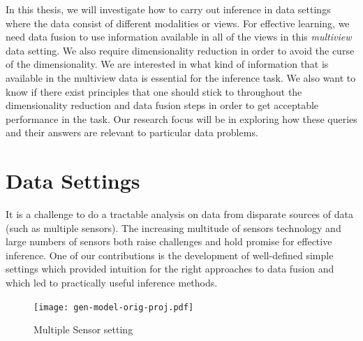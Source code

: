 \documentclass[12pt,oneside,final]{thesis}\usepackage[]{graphicx}\usepackage[]{color}
\begin{document}
In this thesis, we will investigate how to carry out inference in  data  settings where the data consist of different modalities or views. For effective learning, we need data fusion to use information available in all of the views in this \emph{multiview} data setting. We also require dimensionality reduction in order to avoid the curse of the dimensionality. We are interested in what kind of information that is available in the multiview data  is essential for the inference task. We also want to know if there exist principles that one should stick to  throughout the dimensionality reduction and data fusion steps in order to get acceptable performance in the task. Our research focus will be in exploring how these  queries and their answers are  relevant to  particular data problems.

\section{Data Settings}


 It is a challenge  to do a tractable analysis on data from disparate sources of data (such as multiple sensors). The increasing multitude  of sensors technology and large numbers of sensors both raise challenges and hold promise for effective inference. One of our contributions is the development of  well-defined simple settings which provided intuition for the right approaches to data fusion and which led to practically useful inference methods.
 
 
\begin{figure}
\centering
\texttt{[image: gen-model-orig-proj.pdf]}
\caption{Multiple Sensor setting \label{fig:gen-model}}
\end{figure}
\end{document}
